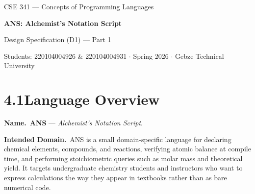 \documentclass[11pt,a4paper]{article}
\begin{document}
\begin{center}
  {\footnotesize\color{anscaption}
    CSE 341 --- Concepts of Programming Languages\par}
  \vspace{4pt}
  {\Huge\bfseries\sffamily
    ANS: Alchemist's Notation Script\par}
  \vspace{6pt}
  {\Large Design Specification (D1) --- Part 1\par}
  \vspace{8pt}
  {\footnotesize\color{anscaption}
    Students: 220104004926 \& 220104004931 \quad$\cdot$\quad
    Spring 2026 \quad$\cdot$\quad
    Gebze Technical University\par}
\end{center}
\vspace{12pt}

\section{4.1\quad Language Overview}

\textbf{Name.}\, \textbf{ANS} --- \textit{Alchemist's Notation Script}.

\textbf{Intended Domain.}\, ANS is a small domain-specific language for declaring chemical elements, compounds, and reactions, verifying atomic balance at compile time, and performing stoichiometric queries such as molar mass and theoretical yield. It targets undergraduate chemistry students and instructors who want to express calculations the way they appear in textbooks rather than as bare numerical code.
\end{document}

